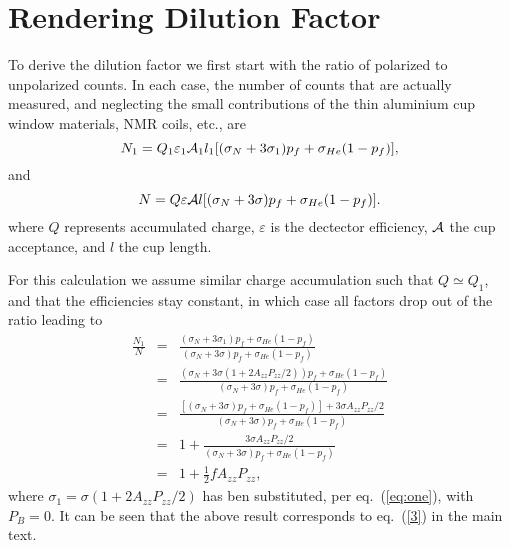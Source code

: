 \documentclass[12pt]{article}
\begin{document}
\appendix
\section{Rendering Dilution Factor}
\label{dil}
To derive the dilution factor we first start with the ratio of 
polarized to unpolarized counts.
In each case, the number of counts that are actually measured, and neglecting 
the small contributions of the thin aluminium cup window materials, NMR coils, etc.,
are
\begin{equation}
N_1=Q_1\varepsilon_1 {\cal A}_1 l_1[(\sigma_N+3\sigma_1)p_f+\sigma_{He}(1-p_f)],
\end{equation}
and
\begin{equation}
N=Q\varepsilon {\cal A}l[(\sigma_N+3\sigma)p_f+\sigma_{He}(1-p_f)].
\end{equation}
where $Q$ represents accumulated charge, $\varepsilon$ is the dectector 
efficiency, ${\cal A}$ the cup acceptance, and $l$ the cup length.  

For
this calculation we assume similar charge accumulation such that $Q\simeq Q_1$, 
and that the efficiencies stay constant, in which case all factors drop out of 
the ratio leading to
\begin{eqnarray}
\nonumber \frac{N_1}{N}& = &\frac{{(\sigma_N+3\sigma_1)p_f+\sigma_{He}(1-p_f)}
}{(\sigma_N+3\sigma)p_f+\sigma_{He}(1-p_f)}\\
\nonumber & = & \frac{{(\sigma_N+3\sigma(1+2A_{zz}P_{zz}/2))p_f+\sigma_{He}(1-p_
f)}}{(\sigma_N+3\sigma)p_f+\sigma_{He}(1-p_f)}\\
\nonumber & = & \frac{{[(\sigma_N+3\sigma)p_f+\sigma_{He}(1-p_
f)]+3\sigma A_{zz}P_{zz}/2}}{(\sigma_N+3\sigma)p_f+\sigma_{He}(1-p_f)}\\
\nonumber & = & 1 + \frac{3\sigma 
A_{zz}P_{zz}/2}{(\sigma_N+3\sigma)p_f+\sigma_{He}(1-p_f)}\\
& = & 1 + \frac{1}{2} f A_{zz}P_{zz}, 
\end{eqnarray}
where $\sigma_1 = \sigma(1+2A_{zz}P_{zz}/2)$ has ben substituted, per 
eq.~(\ref{eq:one}), with $P_B =0$. It can be seen that the above result 
corresponds to eq.~(\ref{3}) in the main text.
\end{document}
